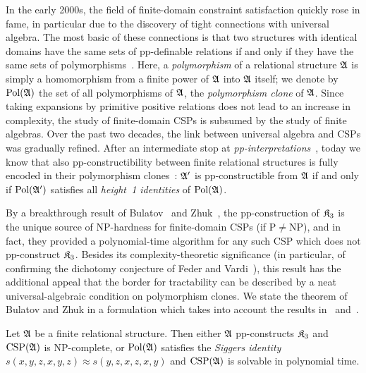 In the early 2000s, the field of finite-domain constraint satisfaction quickly rose in fame, in particular due to the discovery of  tight  connections  with universal algebra.
%
The most basic of these connections is that two structures with identical domains have the same sets of pp-definable relations if and only if they have the same sets of polymorphisms~\cite{jeavons1997closure,jeavons1998algebraic}.
%
Here, a \emph{polymorphism} of a relational structure $\mathfrak{A}$ is simply a homomorphism from a finite power of $\mathfrak{A}$ into $\mathfrak{A}$ itself; we denote by $\mathrm{Pol}(\mathfrak{A})$ the set of all polymorphisms of $\mathfrak{A}$, the \emph{polymorphism clone} of $\mathfrak{A}$.
%  
Since taking expansions by primitive positive relations does not lead to an increase in complexity, the study of finite-domain CSPs is subsumed by the study of finite algebras.
% 
Over the past two decades, the link between universal algebra and CSPs was  gradually refined.
%
After an intermediate stop at \emph{pp-interpretations}~\cite{bulatov2005classifying}, today we know that also pp-constructibility between finite relational structures is fully encoded in their polymorphism clones~\cite[Theorem~1.3]{barto2018wonderland}: $\mathfrak{A'}$ is pp-constructible from  $\mathfrak{A}$ if and only if $\mathrm{Pol}(\mathfrak{A'})$ satisfies all \emph{height~1 identities} of $\mathrm{Pol}(\mathfrak{A})$.


By a breakthrough result of Bulatov~\cite{bulatov2017dichotomy} and Zhuk~\cite{zhuk2017proof,zhuk2020proof}, the pp-construction of $\mathfrak{K}_3$ is the unique source of NP-hardness for finite-domain CSPs (if P$\neq$NP), and in fact, they provided a polynomial-time algorithm for any such CSP which does not  pp-construct $\mathfrak{K}_3$. 
Besides its complexity-theoretic significance (in particular, of confirming the dichotomy conjecture of Feder and Vardi~\cite{federvardi1998}), this result has the additional appeal that the border for tractability can be described by a neat universal-algebraic condition on polymorphism clones.
%  
We state the theorem of Bulatov and Zhuk in a formulation which takes into account the results in~\cite{barto2018wonderland} and~\cite{Siggers_2010}.

\begin{theorem}  \label{thm:finite_domain_CSP} Let $\mathfrak{A}$ be a finite relational structure.
%
Then either $\mathfrak{A}$ pp-constructs $\mathfrak{K}_3$ and $\mathrm{CSP}(\mathfrak{A})$ is NP-complete, or $\mathrm{Pol}(\mathfrak{A})$ satisfies the \emph{Siggers identity} $ s(x,y,z,x,y,z) \approx s(y,z,x,z,x,y)$ and $\mathrm{CSP}(\mathfrak{A})$ is solvable in polynomial time.  
\end{theorem} 
 
